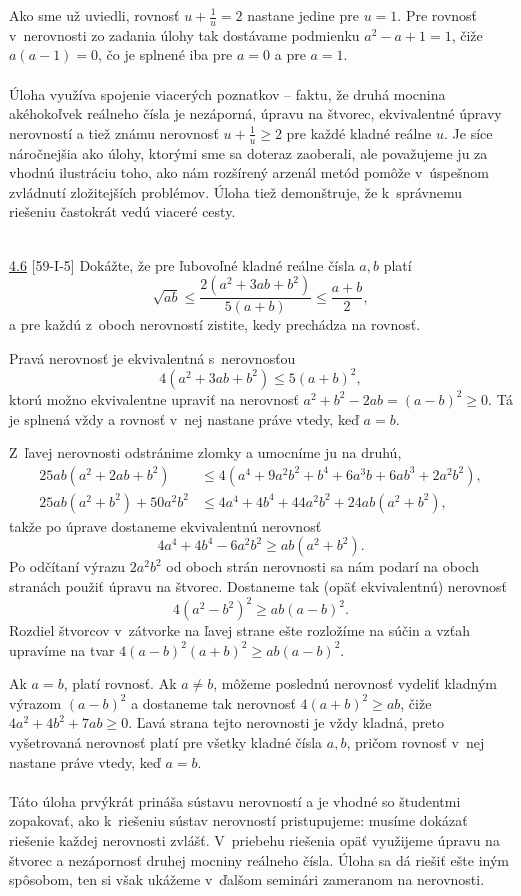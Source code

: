 Ako sme už uviedli, rovnosť $u + \frac{1}{u} = 2$ nastane jedine pre $u = 1$. Pre rovnosť v~nerovnosti zo zadania úlohy tak dostávame podmienku $a^2 -a+1 = 1$, čiže $a(a-1)= 0$, čo je splnené iba pre $a = 0$ a pre $a = 1$.\\
\\
\kom Úloha využíva spojenie viacerých poznatkov -- faktu, že druhá mocnina akéhokoľvek reálneho čísla je nezáporná, úpravu na štvorec, ekvivalentné úpravy nerovností a tiež známu nerovnosť $u+\frac{1}{u} \geq 2$ pre každé kladné reálne $u$. Je síce náročnejšia ako úlohy, ktorými sme sa doteraz zaoberali, ale považujeme ju za vhodnú ilustráciu toho, ako nám rozšírený arzenál metód pomôže v~úspešnom zvládnutí zložitejších problémov. Úloha tiež demonštruje, že k~správnemu riešeniu častokrát vedú viaceré cesty.\\
\\
\begin{tcolorbox}[breakable,notitle,boxrule=0pt,colback=light-gray,colframe=light-gray]\ul{4.6} [59-I-5] Dokážte, že pre ľubovoľné kladné reálne čísla $a, b$ platí
$$ \sqrt{ab}\leq \frac{2(a^2+3ab+b^2)}{5(a+b)}\leq \frac{a+b}{2},$$
a pre každú z~oboch nerovností zistite, kedy prechádza na rovnosť.

\end{tcolorbox}

\rieh Pravá nerovnosť je ekvivalentná s~nerovnosťou
$$ 4(a^2 + 3ab + b^2 ) \leq 5(a + b)^2,$$
ktorú možno ekvivalentne upraviť na nerovnosť $a^2 + b^2 - 2ab = (a - b)^2 \geq 0$. Tá je splnená vždy a rovnosť v~nej nastane práve vtedy, keď $a = b$.

Z~ľavej nerovnosti odstránime zlomky a umocníme ju na druhú,
\begin{align*}
25ab(a^2 + 2ab + b^2) &\leq 4(a^4 + 9a^2 b^2 + b^4 + 6a^3 b + 6ab^3 + 2a^2 b^2),\\
25ab(a^2 + b^2 ) + 50a^2 b^2 &\leq 4a^4 + 4b^4 + 44a^2 b^2 + 24ab(a^2 + b^2 ),
\end{align*}
takže po úprave dostaneme ekvivalentnú nerovnosť
$$4a^4 + 4b^4 - 6a^2 b^2 \geq ab(a^2 + b^2 ).$$
Po odčítaní výrazu $2a^2 b^2$ od oboch strán nerovnosti sa nám podarí na oboch stranách použiť úpravu na štvorec. Dostaneme tak (opäť ekvivalentnú) nerovnosť $$ 4(a^2 - b^2 )^2 \geq ab(a - b)^2.$$
Rozdiel štvorcov v~zátvorke na ľavej strane ešte rozložíme na súčin a vzťah upravíme
na tvar $4(a - b)^2 (a + b)^2 \geq ab(a - b)^2$.

Ak $a = b$, platí rovnosť. Ak $a \neq b$, môžeme poslednú nerovnosť vydeliť kladným výrazom $(a - b)^2$ a dostaneme tak nerovnosť $4(a + b)^2 \geq ab$, čiže $4a^2 + 4b^2 + 7ab \geq 0$. Ľavá strana tejto nerovnosti je vždy kladná, preto vyšetrovaná nerovnosť platí pre všetky kladné čísla $a, b$, pričom rovnosť v~nej nastane práve vtedy, keď $a = b$.\\
\\
\kom Táto úloha prvýkrát prináša sústavu nerovností a je vhodné so študentmi zopakovať, ako k~riešeniu sústav nerovností pristupujeme: musíme dokázať riešenie každej nerovnosti zvlášť. V~priebehu riešenia opäť využijeme úpravu na štvorec a nezápornosť druhej mocniny reálneho čísla. Úloha sa dá riešiť ešte iným spôsobom, ten si však ukážeme v~ďalšom seminári zameranom na nerovnosti.


